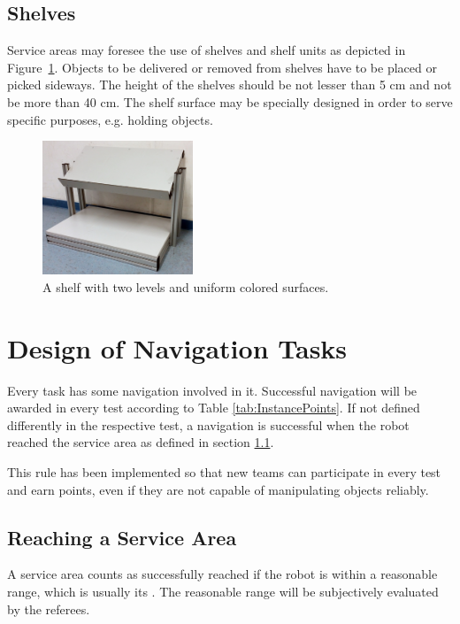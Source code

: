 \subsection{Shelves}\label{sec:Shelves}
Service areas may foresee the use of shelves and shelf units as depicted in Figure~\ref{fig:shelf}. Objects to be delivered or removed from shelves have to be placed or picked sideways. The height of the shelves should be not lesser than 5 cm and not be more than 40 cm.
The shelf surface may be specially designed in order to serve specific purposes, e.g. holding objects.

\begin{figure} [h!]
\centering
\includegraphics[width=0.4\textwidth ]{./images/shelf.jpg}
\caption{A shelf with two levels and uniform colored surfaces.}
\label{fig:shelf}
\end{figure}


\section{Design of Navigation Tasks} \label{sec:NavigationTasks}
Every task has some navigation involved in it. Successful navigation will be awarded in every test according to Table \ref{tab:InstancePoints}. If not defined differently in the respective test, a navigation is successful when the robot reached the service area as defined in section \ref{ssec:Navigating}.
\par
This rule has been implemented so that new teams can participate in every test and earn points, even if they are not capable of manipulating objects reliably.

\subsection{Reaching a Service Area} \label{ssec:Navigating}
A service area counts as successfully reached if the robot is within a reasonable range, which is usually its . The reasonable range will be subjectively evaluated by the referees.


